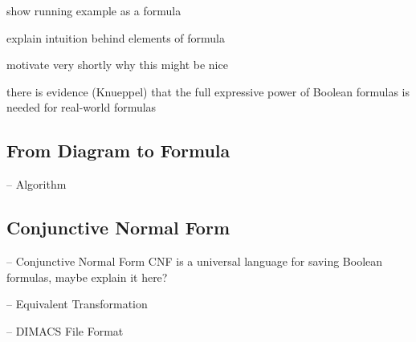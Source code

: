 \begin{frame}{\insertsubsection}
	show running example as a formula
	
	explain intuition behind elements of formula

	motivate very shortly why this might be nice

	there is evidence (Knueppel) that the full expressive power of Boolean formulas is needed for real-world formulas
\end{frame}

\subsection{From Diagram to Formula}


\begin{frame}{-- Algorithm}

\end{frame}

\subsection{Conjunctive Normal Form}

\begin{frame}{-- Conjunctive Normal Form}
	CNF is a universal language for saving Boolean formulas, maybe explain it here?
\end{frame}

\begin{frame}{-- Equivalent Transformation}
	
\end{frame}

\begin{frame}{-- DIMACS File Format}
	
\end{frame}

